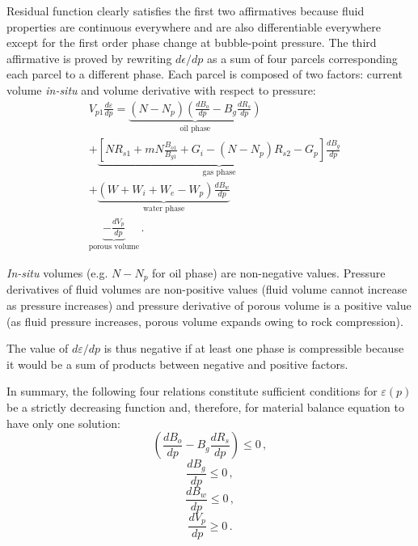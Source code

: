 \documentclass[authoryear,preprint,review,11pt]{elsarticle}
\begin{document}
Residual function clearly satisfies the first two affirmatives because fluid properties are continuous everywhere and are also differentiable everywhere except for the first order phase change at bubble-point pressure.
The third affirmative is proved by rewriting $d\epsilon/dp$ as a sum of four parcels corresponding each parcel to a different phase. Each parcel is composed of two factors: current volume \textit{in-situ} and volume derivative with respect to pressure:
\begin{equation}
\begin{split}
&V_{p1}\frac{d\varepsilon}{dp}=\underbrace{\left(N-N_p\right) \left(\frac{dB_o}{dp} - B_g \frac{dR_s}{dp} \right)}_\text{oil phase}\\
&+\underbrace{\left[N R_{s1}+mN\frac{B_{o1}}{B_{g1}}+G_i-\left(N-N_p\right)R_{s2}-G_p\right] \frac{dB_g}{dp}}_\text{gas phase}\\
&+\underbrace{\left(W + W_i+W_e-W_p\right)\frac{dB_w}{dp}}_\text{water phase}\\
&\underbrace{-\frac{dV_p}{dp}}_\text{porous volume}\, .
\end{split}
\end{equation}

\textit{In-situ} volumes (e.g. $N-N_p$ for oil phase) are non-negative values. Pressure derivatives of fluid volumes are non-positive values (fluid volume cannot increase as pressure increases) and pressure derivative of porous volume is a positive value (as fluid pressure increases, porous volume expands owing to rock compression).

The value of $d\varepsilon/dp$ is thus negative if at least one phase is compressible because it would be a sum of products between negative and positive factors.

In summary, the following four relations constitute sufficient conditions for $\varepsilon(p)$ be a strictly decreasing function and, therefore, for material balance equation to have only one solution:
\begin{equation}\label{eq: PVTH1}
\left(\frac{dB_o}{dp} - B_g \frac{dR_s}{dp} \right) \leq 0 \, ,
\end{equation}
\begin{equation}\label{eq: PVTH2}
\frac{dB_g}{dp} \leq 0 \, ,
\end{equation}
\begin{equation}\label{eq: PVTH3}
\frac{dB_w}{dp} \leq 0 \, ,
\end{equation}
\begin{equation}\label{eq: PVTH4}
\frac{dV_p}{dp} \geq 0 \, .
\end{equation}
\end{document}
